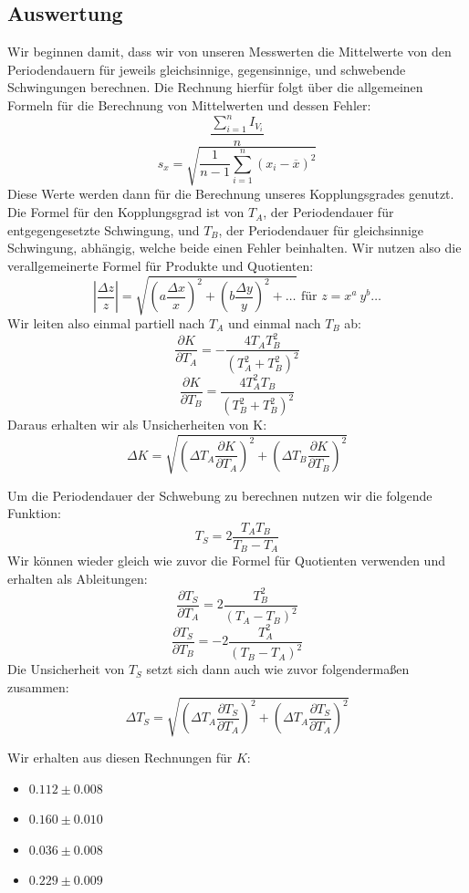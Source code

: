 \documentclass[11pt,a4paper]{article}
\newcommand\mean{\begin{equation}
\frac{\sum_{i=1}^n I_{V_i}}{n}\label{mean}
\end{equation}}
\newcommand\meanstd{\begin{equation}
s_x=\sqrt{\frac{1}{n-1}\sum_{i=1}^n(x_i-\overline{x})^2}\label{meanstd}
\end{equation}}
\newcommand\prodquo{\begin{equation}\left\vert\frac{\Delta z}{z}\right\vert=\sqrt{\left(a\frac{\Delta x}{x}\right)^2+\left(b\frac{\Delta y}{y}\right)^2+\ldots}\textrm{ f\"ur }z=x^a\ y^b\ldots\end{equation}}
\begin{document}
\subsection{Auswertung}

Wir beginnen damit, dass wir von unseren Messwerten die Mittelwerte von den Periodendauern f\"ur jeweils gleichsinnige, gegensinnige, und schwebende Schwingungen berechnen. Die Rechnung hierf\"ur folgt \"uber die allgemeinen Formeln f\"ur die Berechnung von Mittelwerten und dessen Fehler:
\mean
\meanstd
Diese Werte werden dann f\"ur die Berechnung unseres Kopplungsgrades genutzt. Die Formel f\"ur den Kopplungsgrad ist von $T_A$, der Periodendauer f\"ur entgegengesetzte Schwingung, und $T_B$, der Periodendauer f\"ur gleichsinnige Schwingung, abh\"angig, welche beide einen Fehler beinhalten. Wir nutzen also die verallgemeinerte Formel f\"ur Produkte und Quotienten:
\prodquo
Wir leiten also einmal partiell nach $T_A$ und einmal nach $T_B$ ab:
\[
	\frac{\partial K}{\partial T_A}=-\frac{4T_AT_B^2}{(T_A^2+T_B^2)^2}
\]
\[
	\frac{\partial K}{\partial T_B}=\frac{4T_A^2T_B}{(T_B^2+T_B^2)^2}
\]
Daraus erhalten wir als Unsicherheiten von K:
\begin{equation}
	\Delta K=\sqrt{\left(\Delta T_A\frac{\partial K}{\partial T_A}\right)^2+\left(\Delta T_B\frac{\partial K}{\partial T_B}\right)^2}
\end{equation}

Um die Periodendauer der Schwebung zu berechnen nutzen wir die folgende Funktion:
\begin{equation}
	T_S=2\frac{T_AT_B}{T_B-T_A}
\end{equation}
Wir k\"onnen wieder gleich wie zuvor die Formel f\"ur Quotienten verwenden und erhalten als Ableitungen:
\[
	\frac{\partial T_S}{\partial T_A}=2\frac{T_B^2}{(T_A-T_B)^2}
\]
\[
	\frac{\partial T_S}{\partial T_B}=-2\frac{T_A^2}{(T_B-T_A)^2}
\]
Die Unsicherheit von $T_S$ setzt sich dann auch wie zuvor folgenderma\ss en zusammen:
\begin{equation}
	\Delta T_S=\sqrt{\left(\Delta T_A\frac{\partial T_S}{\partial T_A}\right)^2+\left(\Delta T_A\frac{\partial T_S}{\partial T_A}\right)^2}
\end{equation}

Wir erhalten aus diesen Rechnungen f\"ur $K$:
\begin{itemize}
	\item $0.112\pm0.008$
	\item $0.160\pm0.010$
	\item $0.036\pm0.008$
	\item $0.229\pm0.009$
\end{itemize}
\end{document}
